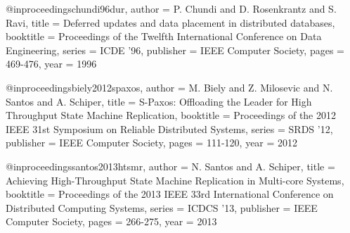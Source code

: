 @inproceedings{chundi96dur,
   author    = {P. Chundi and D. Rosenkrantz and S. Ravi},
   title     = {Deferred updates and data placement in distributed databases},
   booktitle = {Proceedings of the Twelfth International Conference on Data Engineering},
   series    = {ICDE '96},
   publisher = {{IEEE} Computer Society},
   pages     = {469-476},
   year      = {1996}
}

@inproceedings{biely2012spaxos,
   author    = {M. Biely and Z. Milosevic and N. Santos and A. Schiper},
   title     = {{S-Paxos}: Offloading the Leader for High Throughput State Machine Replication},
   booktitle = {Proceedings of the 2012 IEEE 31st Symposium on Reliable Distributed Systems},
   series    = {SRDS '12},
   publisher = {{IEEE} Computer Society},
   pages     = {111-120},
   year      = {2012}
}

@inproceedings{santos2013htsmr,
   author    = {N. Santos and A. Schiper},
   title     = {Achieving High-Throughput State Machine Replication in Multi-core Systems},
   booktitle = {Proceedings of the 2013 IEEE 33rd International Conference on Distributed Computing Systems},
   series    = {ICDCS '13},
   publisher = {{IEEE} Computer Society},
   pages     = {266-275},
   year      = {2013}
}

